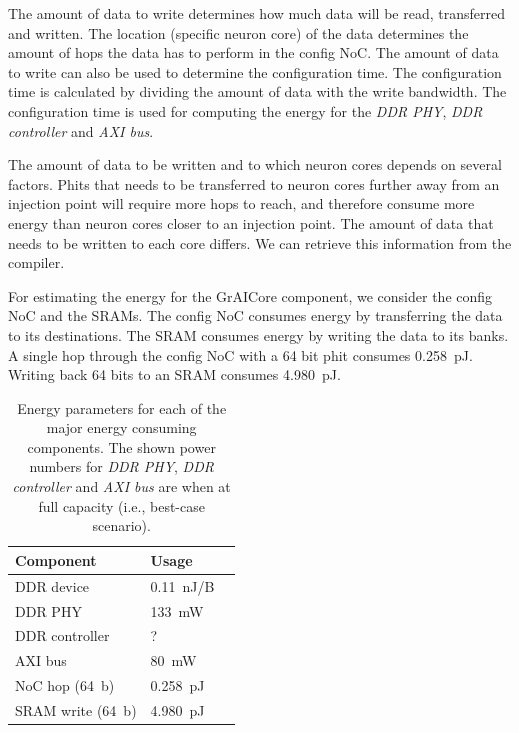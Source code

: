 The amount of data to write determines how much data will be read, transferred and written.
The location (specific neuron core) of the data determines the amount of hops the data has to perform in the config NoC.
The amount of data to write can also be used to determine the configuration time.
The configuration time is calculated by dividing the amount of data with the write bandwidth.
The configuration time is used for computing the energy for the \textit{DDR PHY}, \textit{DDR controller} and \textit{AXI bus}.

The amount of data to be written and to which neuron cores depends on several factors. %
Phits that needs to be transferred to neuron cores further away from an injection point will require more hops to reach, and therefore consume more energy than neuron cores closer to an injection point.
The amount of data that needs to be written to each core differs.
We can retrieve this information from the compiler.

For estimating the energy for the GrAICore component, we consider the config NoC and the SRAMs.
The config NoC consumes energy by transferring the data to its destinations.
The SRAM consumes energy by writing the data to its banks.
A single hop through the config NoC with a 64 bit phit consumes \SI{0.258}{pJ}.
Writing back 64 bits to an SRAM consumes \SI{4.980}{pJ}.

\begin{table}[hbtp]
\centering
\begin{tabular}{@{}lll@{}}
\toprule
\textbf{Component}      & \textbf{Usage}  &  \\
\midrule
DDR device              & \SI{0.11}{nJ/B} &  \\
DDR PHY                 & \SI{133}{mW}    &  \\
DDR controller          & ?               &  \\
AXI bus                 & \SI{80}{mW}     &  \\
NoC hop (\SI{64}{b})    & \SI{0.258}{pJ}  &  \\
SRAM write (\SI{64}{b}) & \SI{4.980}{pJ}  &  \\
\bottomrule
\end{tabular}
\caption{Energy parameters for each of the major energy consuming components. The shown power numbers for \textit{DDR PHY}, \textit{DDR controller} and \textit{AXI bus} are when at full capacity (i.e., best-case scenario).}
\label{tab:energy_parameters_ddr}
\end{table}

